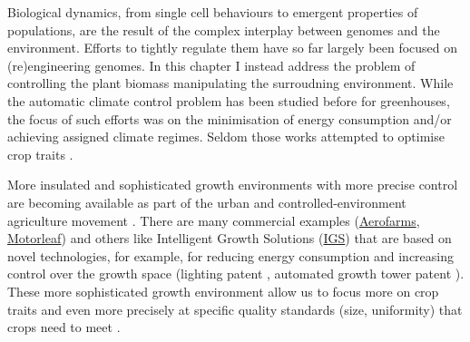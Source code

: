 Biological dynamics, from single cell behaviours to emergent properties of
populations, are the result of the complex interplay between genomes and the
environment. Efforts to tightly regulate them have so far largely been focused
on (re)engineering genomes. In this chapter I instead address the problem of
controlling the plant biomass manipulating the surroudning environment. While the
automatic climate control problem has been studied before for greenhouses, the
focus of such efforts was on the minimisation of energy consumption and/or
achieving assigned climate regimes. Seldom those works attempted to optimise
crop traits \citep{chalabi1996, udinktencate1983, challa_1990, aaslyng2003}.

More insulated and sophisticated growth environments with more precise control
are becoming available as part of the urban and controlled-environment
agriculture movement \citep{mok_strawberry_2014, despommier_farming_2013}. There
are many commercial examples (\href{https://aerofarms.com/}{Aerofarms},
\href{https://motorleaf.com/}{Motorleaf}) and others like Intelligent Growth
Solutions (\href{https://www.intelligentgrowthsolutions.com/}{IGS}) that are
based on novel technologies, for example, for reducing energy consumption and
increasing control over the growth space (lighting patent
\cite{aykroyd_novel_2016}, automated growth tower patent
\cite{aykroyd_automated_2018}). These more sophisticated growth environment
allow us to focus more on crop traits and even more precisely at specific
quality standards (size, uniformity) that crops need to meet \citep[see for
example EU marketing standards on fruit and vegetables;][]{eu-543-2011}.

